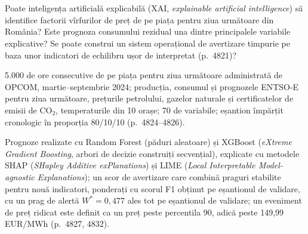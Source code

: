 \section{}
\textbf{} %
{Poate inteligența artificială explicabilă (XAI, \emph{explainable artificial intelligence}) să identifice factorii vîrfurilor de preț de pe piața pentru ziua următoare din România? Este prognoza consumului rezidual una dintre principalele variabile explicative? Se poate construi un sistem operațional de avertizare timpurie pe baza unor indicatori de echilibru ușor de interpretat (p.~4821)?}

\textbf{} %
{5.000 de ore consecutive de pe piața pentru ziua următoare administrată de OPCOM, martie--septembrie 2024; producția, consumul și prognozele ENTSO-E pentru ziua următoare, prețurile petrolului, gazelor naturale și certificatelor de emisii de CO$_2$, temperaturile din 10 orașe; 70 de variabile; eșantion împărțit cronologic în proporția 80/10/10 (p.~4824--4826).}

\textbf{} %
{Prognoze realizate cu Random Forest (păduri aleatoare) și XGBoost (\emph{eXtreme Gradient Boosting}, arbori de decizie construiți secvențial), explicate cu metodele SHAP (\emph{SHapley Additive exPlanations}) și LIME (\emph{Local Interpretable Model-agnostic Explanations});
un scor de avertizare care combină praguri stabilite pentru nouă indicatori, ponderați cu scorul F1 obținut pe eșantionul de validare, cu un prag de alertă $W^*=0{,}477$ ales tot pe eșantionul de validare; un eveniment de preț ridicat este definit ca un preț peste percentila 90, adică peste 149,99 EUR/MWh (p.~4827, 4832).}

